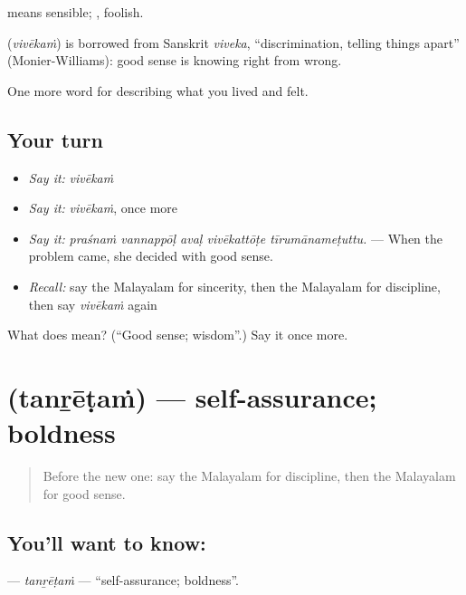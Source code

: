  means sensible; , foolish.

\begin{cousinweb}
\textbf{} (\emph{vivēkaṁ}) is borrowed from Sanskrit \emph{viveka}, \textquotedblleft{}discrimination, telling things apart\textquotedblright{} (Monier-Williams): good sense is knowing right from wrong.
\end{cousinweb}

\begin{grammarlens}[title={What you've built}]
One more word for describing what you lived and felt.
\end{grammarlens}

\subsection*{Your turn}
\begin{itemize}
\raggedright
  \item \emph{Say it:} \emph{vivēkaṁ}
  \item \emph{Say it:} \emph{vivēkaṁ}, once more
  \item \emph{Say it:} \emph{praśnaṁ vannappōḷ avaḷ vivēkattōṭe tīrumānameṭuttu.} — When the problem came, she decided with good sense.
  \item \emph{Recall:} say the Malayalam for sincerity, then the Malayalam for discipline, then say \emph{vivēkaṁ} again
\end{itemize}

\begin{tcolorbox}[breakable,colback=teal!4,colframe=teal!35!black,title={Before you move on}]
What does  mean? (\textquotedblleft{}Good sense; wisdom\textquotedblright{}.) Say it once more.
\end{tcolorbox}
\section[\texorpdfstring{\ml{തന്റേടം} (tanṟēṭaṁ)}{തന്റേടം (tanṟēṭaṁ)}]{ (tanṟēṭaṁ) — self-assurance; boldness}

\label{lesson:ML-C529-tanretam}



\begin{quote}
Before the new one: say the Malayalam for discipline, then the Malayalam for good sense.
\end{quote}

\subsection*{You'll want to know: }
\textbf{} — \emph{tanṟēṭaṁ} — \textquotedblleft{}self-assurance; boldness\textquotedblright{}.

